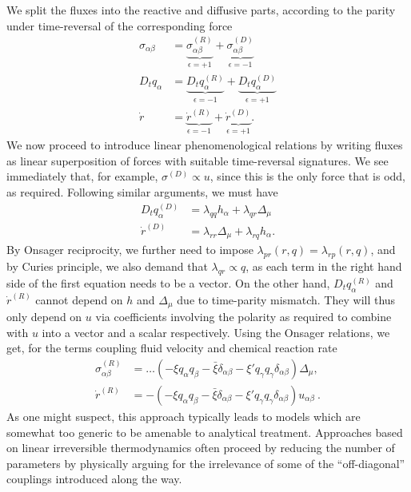 We split the fluxes into the reactive and diffusive parts, according to the parity under time-reversal of the corresponding force
%
\begin{align}
    \sigma_{\alpha \beta} 
    & = \underbrace{\sigma_{\alpha \beta}^{(R)}}_{\epsilon=+1}
    + \underbrace{\sigma_{\alpha \beta}^{(D)}}_{\epsilon=-1}\\
    D_t q_\alpha
    & = \underbrace{D_t q_\alpha^{(R)}}_{\epsilon=-1}
    + \underbrace{D_t q_\alpha^{(D)}}_{\epsilon=+1}\\
    \dot r
    & = \underbrace{\dot r^{(R)}}_{\epsilon=-1}
    + \underbrace{\dot r^{(D)}}_{\epsilon=+1}.
\end{align}
%
We now proceed to introduce linear phenomenological relations by writing fluxes as linear superposition of forces with suitable time-reversal signatures. We see immediately that, for example, $\sigma^{(D)} \propto u$, since this is the only force that is odd, as required.
Following similar arguments, we must have
%
\begin{align}
    D_t q_\alpha^{(D)} &= \lambda_{qq} h_\alpha + \lambda_{qr} \Delta_\mu \\
    \dot r^{(D)} &= \lambda_{rr} \Delta_\mu + \lambda_{rq} h_\alpha.
\end{align}
%
By Onsager reciprocity, we further need to impose $\lambda_{pr}(r, q) = \lambda_{rp}(r, q)$, and by Curies principle, we also demand that $\lambda_{q r} \propto q$, as each term in the right hand side of the first equation needs to be a vector.
On the other hand, $D_t q_\alpha^{(R)}$ and $\dot r^{(R)}$ cannot depend on $h$ and $\Delta_\mu$ due to time-parity mismatch. They will thus only depend on $u$ via coefficients involving the polarity as required to combine with $u$ into a vector and a scalar respectively.
Using the Onsager relations, we get, for the terms coupling fluid velocity and chemical reaction rate
%
\begin{align}
    \sigma_{\alpha \beta}^{(R)} 
    &= \dots
    \left(- \xi q_\alpha q_\beta - \bar \xi \delta_{\alpha \beta} - \xi' q_\gamma q_\gamma \delta_{\alpha \beta}\right)
    \Delta_\mu, \\
    \dot r^{(R)} 
    &= -
    \left(- \xi q_\alpha q_\beta - \bar \xi \delta_{\alpha \beta} - \xi' q_\gamma q_\gamma \delta_{\alpha \beta}\right)
    u_{\alpha \beta}~.
\end{align}
As one might suspect, this approach typically leads to models which are somewhat too generic to be amenable to analytical treatment. Approaches based on linear irreversible thermodynamics often proceed by reducing the number of parameters by physically arguing for the irrelevance of some of the ``off-diagonal'' couplings introduced along the way. 
